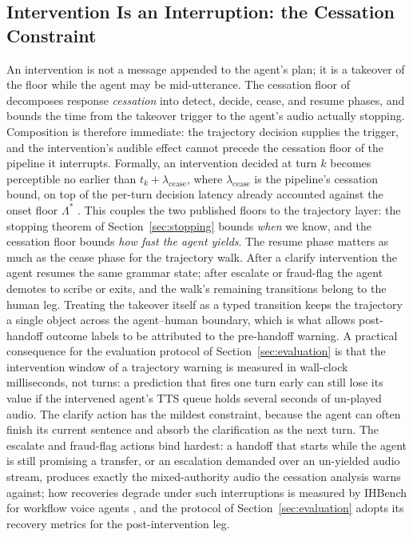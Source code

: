 \subsection{Intervention Is an Interruption: the Cessation Constraint}
An intervention is not a message appended to the agent's plan; it is a takeover of the floor
while the agent may be mid-utterance.
The cessation floor of \citet{garcia2026cessationfloor} decomposes response \emph{cessation}
into detect, decide, cease, and resume phases, and bounds the time from the takeover trigger
to the agent's audio actually stopping.
Composition is therefore immediate: the trajectory decision supplies the trigger, and the
intervention's audible effect cannot precede the cessation floor of the pipeline it interrupts.
Formally, an intervention decided at turn $k$ becomes perceptible no earlier than
$t_k + \lambda_{\mathrm{cease}}$, where $\lambda_{\mathrm{cease}}$ is the pipeline's cessation
bound, on top of the per-turn decision latency already accounted against the onset floor
$\Lambda^*$ \citep{garcia2026latencyfloor}.
This couples the two published floors to the trajectory layer: the stopping theorem of
Section~\ref{sec:stopping} bounds \emph{when} we know, and the cessation floor bounds
\emph{how fast the agent yields}.
The resume phase matters as much as the cease phase for the trajectory walk.
After a clarify intervention the agent resumes the same grammar state; after escalate or
fraud-flag the agent demotes to scribe or exits, and the walk's remaining transitions belong
to the human leg.
Treating the takeover itself as a typed transition keeps the trajectory a single object across
the agent--human boundary, which is what allows post-handoff outcome labels to be attributed
to the pre-handoff warning.
A practical consequence for the evaluation protocol of Section~\ref{sec:evaluation} is that
the intervention window of a trajectory warning is measured in wall-clock milliseconds, not
turns: a prediction that fires one turn early can still lose its value if the intervened
agent's TTS queue holds several seconds of un-played audio.
The clarify action has the mildest constraint, because the agent can often finish its current
sentence and absorb the clarification as the next turn.
The escalate and fraud-flag actions bind hardest: a handoff that starts while the agent is
still promising a transfer, or an escalation demanded over an un-yielded audio
stream, produces exactly the mixed-authority audio the cessation analysis warns against; how
recoveries degrade under such interruptions is measured by IHBench for workflow voice agents
\citep{salimi2026ihbench}, and the protocol of Section~\ref{sec:evaluation} adopts its
recovery metrics for the post-intervention leg.

